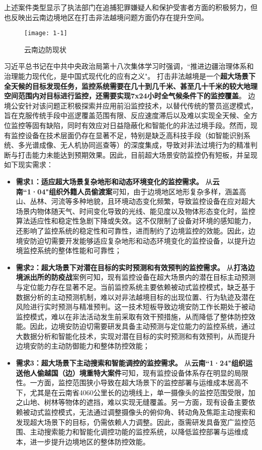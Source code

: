 上述案件类型显示了执法部门在追捕犯罪嫌疑人和保护受害者方面的积极努力，但也反映出云南边境地区在打击非法越境问题方面仍存在提升空间。

\begin{figure}[h!]
\centering %
\texttt{[image: 1-1]}
\captionsetup{justification=centering} %
\caption{云南边防现状}
\label{fig:current-state}
\end{figure}

习近平总书记在中共中央政治局第十八次集体学习时强调，``推进边疆治理体系和治理能力现代化，是中国式现代化的应有之义"。
打击非法越境是一个\textbf{超大场景下全天候的目标发现任务，监控系统需要在几十到几千米、甚至几十千米的较大地理空间范围内对目标进行监控，还需要实现7x24小时全气候条件下的监控覆盖}。
边境公安针对该问题正积极探索并应用前沿监控技术，以替代传统的警员巡逻模式，旨在克服传统手段中巡逻覆盖范围有限、反应速度滞后以及难以实现全天候、全方位监控等固有缺陷，同时有效应对日益隐蔽化和智能化的非法过境手段。然而，现有监控设备在技术层面仍存在显著不足，特别是缺乏高科技手段（如智能识别系统、多光谱成像、无人机协同巡查等）的深度集成，导致对非法过境行为的精准判断与打击能力未能达到预期效果。因此，目前超大场景安防监控仍有短板，并呈现如下现实需求：

\begin{itemize}[left=15pt,itemsep=1em,label={\textasteriskcentered}]
\item \textbf{需求1：适应超大场景复杂地形和动态环境变化的监控需求。} 从\textbf{云南``1·04"组织外籍人员偷渡案}可知，由于边境地区地形复杂多样，涵盖高山、丛林、河流等多种地貌，且环境动态变化频繁，导致监控设备在应对超大场景内物体随天气、时间变化导致的光线、能见度以及物体形态变化时，监控算法适应性和稳定性急剧下降或失效。这不仅限制了设备对环境的感知能力，还影响了监控系统的稳定性和可靠性，进而制约了边境监控的效能。因此，边境安防迫切需要开发能够适应复杂地形和动态环境变化的监控设备，以提升边境监控系统的整体性能和可靠性；
\item \textbf{需求2：超大场景下对潜在目标的实时预测和有效预判的监控需求。} 从\textbf{打洛边境派出所的防疫战}案例可知，现有监控设备在超大场景内的潜在目标主动预测与定位能力存在显著不足。当前监控系统主要依赖被动式监控模式，缺乏基于数据分析的主动预测机制，难以对非法越境目标的出现位置、行为轨迹及潜在风险进行实时预测与精准预判。这一技术短板导致边境安防工作长期处于被动监控模式，难以在非法活动发生前采取有效干预措施，从而降低了整体防控效能。因此，边境安防迫切需要研发具备主动预测与定位能力的监控系统，通过大数据分析和智能化技术，实现对潜在目标的实时预测和有效预判，从而提升边境安防的主动防御能力和整体防控效能；
\item \textbf{需求3：超大场景下主动搜索和智能调控的监控需求。} 从\textbf{云南``1·24"组织运送他人偷越国（边）境重特大案件}可知，现有监控设备体系存在明显的局限性。一方面，监控范围狭小导致在超大场景下的监控部署与运维成本居高不下，尤其是在云南省4060公里长的边境线上，单一摄像头的监控范围受限，加之山地、树林等物体的遮挡，难以实现无缝覆盖。另一方面，现有设备主要依赖被动式监控模式，无法通过调整摄像头的俯仰角、转动角及焦距主动搜索和发现超大场景下的目标，仍需依赖人力调整。因此，亟需研发具备宽广监控范围、主动搜索能力和智能化调控功能的监控系统，以降低监控部署与运维成本，进一步提升边境地区的整体防控效能。
\end{itemize}


